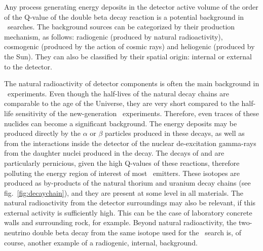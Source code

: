 Any process generating energy deposits in the detector active volume of the order of the Q-value of the double beta decay reaction is a potential background in \bbonu\ searches. The background sources can be categorized by their production mechanism, as follows: radiogenic (produced by natural radioactivity), cosmogenic (produced by the action of cosmic rays) and heliogenic (produced by the Sun). They can also be classified by their spatial origin: internal or external to the detector.

The natural radioactivity of detector components is often the main background in \bbonu\ experiments. Even though the half-lives of the natural decay chains are comparable to the age of the Universe, they are very short compared to the half-life sensitivity of the new-generation \bbonu\ experiments. Therefore, even traces of these nuclides can become a significant background. The energy deposits may be produced directly by the $\alpha$ or $\beta$ particles produced in these decays, as well as from the interactions inside the detector of the nuclear de-excitation gamma-rays from the daughter nuclei produced in the decay. The decays of  and  are particularly pernicious, given the high Q-values of these reactions, therefore polluting the energy region of interest of most \bb\ emitters. These isotopes are produced as by-products of the natural thorium and uranium decay chains (see fig.~\ref{fig:decaychain}), and they are present at some level in all materials. The natural radioactivity from the detector surroundings may also be relevant, if this external activity is sufficiently high. This can be the case of laboratory concrete walls and surrounding rock, for example. Beyond natural radioactivity, the two-neutrino double beta decay from the same isotope used for the \bbonu\ search is, of course, another example of a radiogenic, internal, background. 

